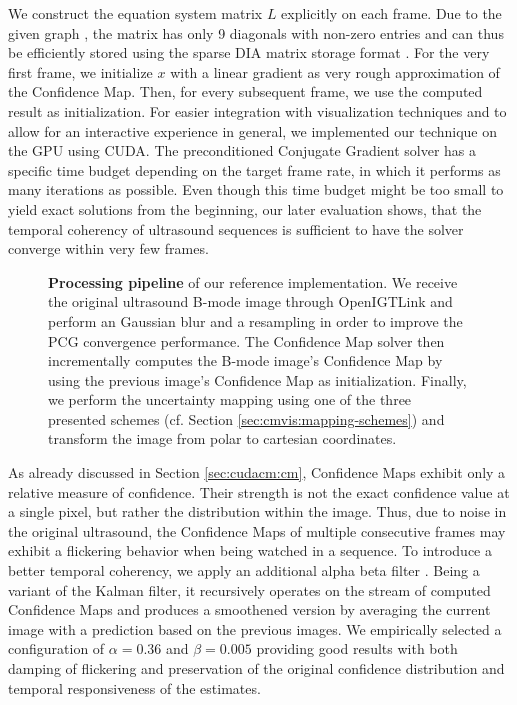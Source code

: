 We construct the equation system matrix $L$ explicitly on each frame.
Due to the given graph , the matrix has only 9 diagonals with non-zero entries and can thus be efficiently stored using the sparse DIA matrix storage format \CN.
For the very first frame, we initialize $x$ with a linear gradient as very rough approximation of the Confidence Map.
Then, for every subsequent frame, we use the computed result as initialization.
For easier integration with visualization techniques and to allow for an interactive experience in general, we implemented our technique on the GPU using CUDA.
The preconditioned Conjugate Gradient solver has a specific time budget depending on the target frame rate, in which it performs as many iterations as possible.
Even though this time budget might be too small to yield exact solutions from the beginning, our later evaluation shows, that the temporal coherency of ultrasound sequences is sufficient to have the solver converge within very few frames.

\begin{figure}[t]
	\centering
	
	\caption{
		\textbf{Processing pipeline} of our reference implementation. We receive the original ultrasound B-mode image through OpenIGTLink and perform an Gaussian blur and a resampling in order to improve the PCG convergence performance. 
		The Confidence Map solver then incrementally computes the B-mode image's Confidence Map by using the previous image's Confidence Map as initialization. 
		Finally, we perform the uncertainty mapping using one of the three presented schemes (cf. Section \ref{sec:cmvis:mapping-schemes}) and transform the image from polar to cartesian coordinates.
	}
	\label{fig:cmvis:campvis_pipeline}
\end{figure}

As already discussed in Section \ref{sec:cudacm:cm}, Confidence Maps exhibit only a relative measure of confidence.
Their strength is not the exact confidence value at a single pixel, but rather the distribution within the image.
Thus, due to noise in the original ultrasound, the Confidence Maps of multiple consecutive frames may exhibit a flickering behavior when being watched in a sequence.
To introduce a better temporal coherency, we apply an additional alpha beta filter \cite{Brookner:1998:Filtering}.
Being a variant of the Kalman filter, it recursively operates on the stream of computed Confidence Maps and produces a smoothened version by averaging the current image with a prediction based on the previous images.
We empirically selected a configuration of $\alpha = 0.36$ and $\beta = 0.005$ providing good results with both damping of flickering and preservation of the original confidence distribution and temporal responsiveness of the estimates.



